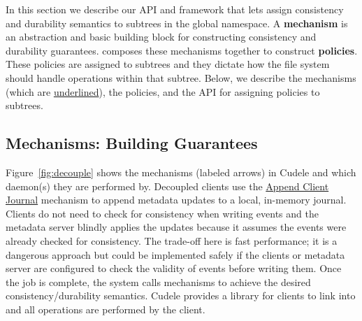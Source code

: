 
In this section we describe our API and framework that lets
 assign consistency and durability
semantics to subtrees in the global namespace. A \textbf{mechanism} is an
abstraction and basic building block for constructing consistency and
durability guarantees.  composes these mechanisms together to
construct \textbf{policies}.  These policies are assigned to subtrees and they
dictate how the file system should handle operations within that subtree.
Below, we describe the mechanisms (which are \underline{underlined}), the
policies, and the API for assigning policies to subtrees.

\subsection{Mechanisms: Building Guarantees}
\label{sec:the-cudelesfs-mechanisms}

Figure~\ref{fig:decouple} shows the mechanisms (labeled arrows) in Cudele and
which daemon(s) they are performed by.   Decoupled clients use the
\underline{Append Client Journal} mechanism to append metadata updates to a
local, in-memory journal. Clients do not need to check for
consistency when writing events and the metadata server blindly applies the
updates because it assumes the events were already checked for consistency. The
trade-off here is fast performance; it is a dangerous approach but could be
implemented safely if the clients or metadata server are configured to check
the validity of events before writing them.  Once the job is complete, the
system calls mechanisms to achieve the desired consistency/durability
semantics.  Cudele provides a library for clients to link into and all
operations are performed by the client.  

